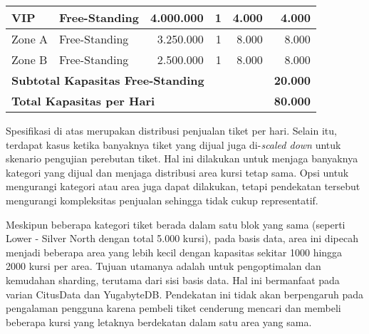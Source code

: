 \begin{longtable}{|l|l|r|r|r|r|}
    VIP                                                             & Free-Standing   & 4.000.000           & 1             & 4.000               & 4.000          \\
    \hline
    Zone A                                                          & Free-Standing   & 3.250.000           & 1             & 8.000               & 8.000          \\
    \hline
    Zone B                                                          & Free-Standing   & 2.500.000           & 1             & 8.000               & 8.000          \\
    \hline
    \multicolumn{5}{|l|}{\textbf{Subtotal Kapasitas Free-Standing}} & \textbf{20.000}                                                                              \\
    \hline \hline

    \multicolumn{5}{|l|}{\textbf{Total Kapasitas per Hari}}         & \textbf{80.000}                                                                              \\
\end{longtable}
\endgroup

Spesifikasi di atas merupakan distribusi penjualan tiket per hari. Selain itu, terdapat kasus ketika banyaknya tiket yang dijual juga di-\textit{scaled down} untuk skenario pengujian perebutan tiket. Hal ini dilakukan untuk menjaga banyaknya kategori yang dijual dan menjaga distribusi area kursi tetap sama. Opsi untuk mengurangi kategori atau area juga dapat dilakukan, tetapi pendekatan tersebut mengurangi kompleksitas penjualan sehingga tidak cukup representatif.

Meskipun beberapa kategori tiket berada dalam satu blok yang sama (seperti Lower - Silver North dengan total 5.000 kursi), pada basis data, area ini dipecah menjadi beberapa area yang lebih kecil dengan kapasitas sekitar 1000 hingga 2000 kursi per area. Tujuan utamanya adalah untuk pengoptimalan dan kemudahan sharding, terutama dari sisi basis data. Hal ini bermanfaat pada varian CitusData dan YugabyteDB. Pendekatan ini tidak akan berpengaruh pada pengalaman pengguna karena pembeli tiket cenderung mencari dan membeli beberapa kursi yang letaknya berdekatan dalam satu area yang sama.